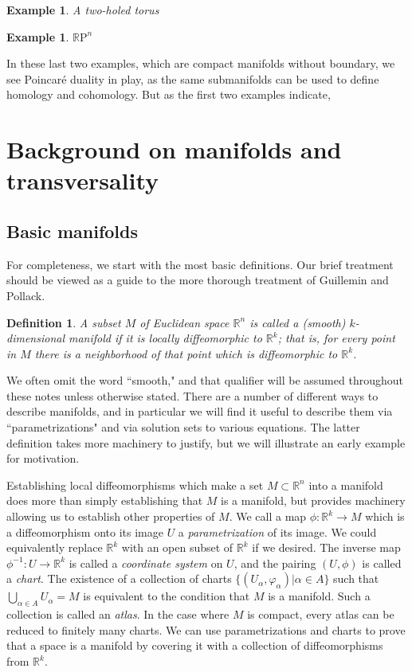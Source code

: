 \documentclass{amsart}          %
\newtheorem{definition}[theorem]{Definition}
\newtheorem{example}[theorem]{Example}
\newcommand{\R}{\mathbb R}
\newcommand{\RP}{\mathbb{R}\mathrm{P}}
\begin{document}
\begin{example}
A two-holed torus
\end{example}
\begin{example}
$\RP^{n}$ 
\end{example}

In these last two examples, which are compact manifolds without boundary,
we see Poincar\'e duality in play, as the same submanifolds can be used to define homology and cohomology.  But as the first two
examples indicate,  

\section{Background on manifolds and transversality}


\subsection{Basic manifolds}

For completeness, we start with the most basic definitions.  Our brief treatment should be viewed as a guide to the more thorough treatment
of Guillemin and Pollack.

\begin{definition}
	A subset $M$ of Euclidean space $\R^n$ is called a (smooth) $k$-dimensional manifold if it is locally diffeomorphic to $\R^k$; that is, for every point in $M$ there is a neighborhood of that point which is diffeomorphic to $\R^k$.  
\end{definition}

We often omit the word ``smooth," and that qualifier will be assumed throughout these notes unless otherwise stated. There are a number of different ways to describe manifolds, and in particular we will find it useful to describe them via ``parametrizations" and via solution sets to various equations. The latter definition takes more machinery to justify, but we will illustrate an early example for motivation.

Establishing local diffeomorphisms which make a set $M\subset \R^n$ into a manifold does more than simply establishing that $M$ is a manifold, but provides machinery allowing us to establish other properties of $M$. We call a map $\phi: \R^k \rightarrow M$ which is a diffeomorphism onto its image $U$ a \textit{parametrization} of its image. We could equivalently replace $\R^k$ with an open subset of $\R^k$ if we desired. The inverse map $\phi^{-1}:U\rightarrow \R^k$ is called a \textit{coordinate system} on $U$, and the pairing $(U, \phi)$ is called a \textit{chart}. The existence of a collection of charts $\{ (U_\alpha, \varphi_\alpha) | \alpha \in A\}$ such that $\bigcup_{\alpha\in A}U_\alpha = M$ is equivalent to the condition that $M$ is a manifold. Such a collection is called an \textit{atlas}. In the case where $M$ is compact, every atlas can be reduced to finitely many charts. We can use parametrizations and charts to prove that a space is a manifold by covering it with a collection of diffeomorphisms from $\R^k$.
\end{document}
